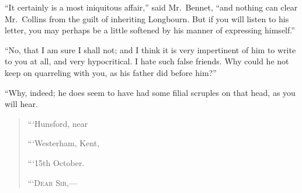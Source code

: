 \documentclass[12pt,english]{book}
\newcommand{\noun}[1]{\textsc{#1}}
\begin{document}
{}``It certainly is a most iniquitous affair,'' said Mr.\ Bennet,
{}``and nothing can clear Mr.\ Collins from the guilt of inheriting
Longbourn. But if you will listen to his letter, you may perhaps be
a little softened by his manner of expressing himself.''

{}``No, that I am sure I shall not; and I think it is very impertinent
of him to write to you at all, and very hypocritical. I hate such
false friends. Why could he not keep on quarreling with you, as his
father did before him?''\ 

{}``Why, indeed; he does seem to have had some filial scruples on
that head, as you will hear.

\begin{quotation}
```Hunsford, near

```Westerham, Kent,

```15th October.

\noindent {}``\noun{`Dear Sir},\mbox{---}


\end{quotation}
\end{document}

